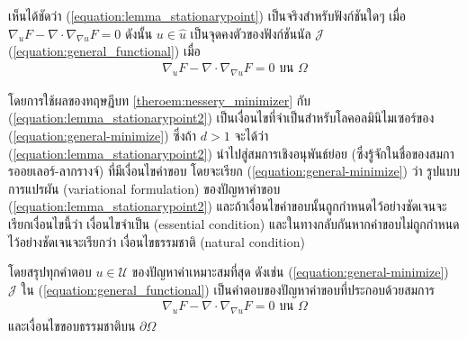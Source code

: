 \hspace{1cm} เห็นได้ชัดว่า (\ref{equation:lemma_stationarypoint}) เป็นจริงสำหรับฟังก์ชันใดๆ เมื่อ $\nabla_u F - \nabla \cdot \nabla_{\nabla u} F = 0$ ดังนั้น $u \in \hat{u}$ เป็นจุดคงตัวของฟังก์ชันนัล $\mathcal{J}$ (\ref{equation:general_functional}) เมื่อ 
\begin{align}
    \nabla_{u} F - \nabla \cdot \nabla_{\nabla u} F = 0 \text{ บน } \Omega
    \label{equation:lemma_stationarypoint2}
\end{align}

โดยการใช้ผลของทฤษฏีบท \ref{theroem:nessery_minimizer} กับ (\ref{equation:lemma_stationarypoint2}) เป็นเงื่อนไขที่จำเป็นสำหรับโลคอลมินิไมเซอร์ของ (\ref{equation:general-minimize}) ซึ่งถ้า $ d > 1$ จะได้ว่า (\ref{equation:lemma_stationarypoint2}) นำไปสู่สมการเชิงอนุพันธ์ย่อย (ซึ่งรู้จักในชื่อของสมการออยเลอร์-ลากรางจ์) ที่มีเงื่อนไขค่าขอบ โดยจะเรียก (\ref{equation:general-minimize}) ว่า รูปแบบการแปรผัน (variational formulation) ของปัญหาค่าขอบ (\ref{equation:lemma_stationarypoint2}) และถ้าเงื่อนไขค่าขอบนั้นถูกกำหนดไว้อย่างชัดเจนจะเรียกเงื่อนไขนี้ว่า เงื่อนไขจำเป็น (essential condition) และในทางกลับกันหากค่าขอบไม่ถูกกำหนดไว้อย่างชัดเจนจะเรียกว่า เงื่อนไขธรรมชาติ (natural condition) 

\hspace{1cm} โดยสรุปทุกคำตอบ $u \in \mathcal{U}$ ของปัญหาค่าเหมาะสมที่สุด ดังเช่น (\ref{equation:general-minimize}) $\mathcal{J}$ ใน (\ref{equation:general_functional}) เป็นคำตอบของปัญหาค่าขอบที่ประกอบด้วยสมการ
\begin{align*}
    \nabla_u F - \nabla \cdot \nabla_{\nabla u} F = 0 \text{ บน } \Omega 
\end{align*}
และเงื่อนไขขอบธรรมชาติบน $\partial \Omega$

